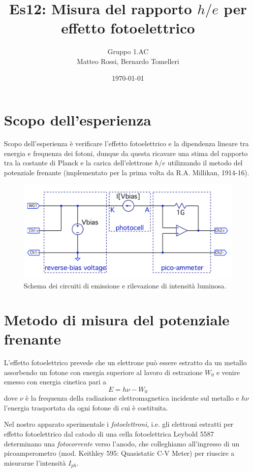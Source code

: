 \documentclass[10pt, a4paper, italian]{article}
\author{Gruppo 1.AC \\ Matteo Rossi, Bernardo Tomelleri}
\title{Es12: Misura del rapporto $h/e$ per effetto fotoelettrico}
\begin{document}
\date{\today}
\maketitle

\section{Scopo dell'esperienza}
Scopo dell'esperienza è verificare l'effetto fotoelettrico e la dipendenza
lineare tra energia e frequenza dei fotoni, dunque da questa ricavare una stima
del rapporto tra la costante di Planck e la carica dell'elettrone $h/e$
utilizzando il metodo del potenziale frenante (implementato per la prima volta
da R.A. Millikan, 1914-16).

\begin{figure}[htbp]
    \centering
	\includegraphics[scale=0.7]{schm}
    \caption{Schema dei circuiti di emissione e rilevazione di intensità
    luminosa.
    \label{schm: mesctrl}}
\end{figure}

\section{Metodo di misura del potenziale frenante}
L'effetto fotoelettrico prevede che un elettrone può essere estratto da un
metallo assorbendo un fotone con energia superiore al lavoro di estrazione
$W_{0}$ e venire emesso con energia cinetica pari a
\begin{equation}\label{eq: cons}
E = h \nu - W_0
\end{equation}
dove $\nu$ è la frequenza della radiazione elettromagnetica incidente sul
metallo e $h \nu$ l'energia trasportata da ogni fotone di cui è costituita.

Nel nostro apparato sperimentale i \emph{fotoelettroni}, i.e. gli elettroni
estratti per effetto fotoelettrico dal catodo di una cella fotoelettrica
Leybold 5587 determinano una \emph{fotocorrente} verso l'anodo, che
colleghiamo all'ingresso di un picoamperometro (mod. Keithley 595: Quasistatic
C-V Meter) per riuscire a misurarne l'intensità $I_{ph}$.
\end{document}

